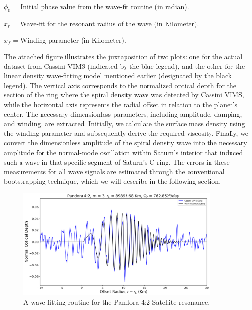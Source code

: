 \documentclass{article}
\begin{document}
\vspace{3pt}
\textbf{$\phi_{0}$} = Initial phase value from the wave-fit routine (in radian).

\vspace{3pt}
\textbf{$x_{r}$} = Wave-fit for the resonant radius of the wave (in Kilometer).

\vspace{3pt}
\textbf{$x_{f}$} = Winding parameter (in Kilometer).

\vspace{10pt}
The attached figure illustrates the juxtaposition of two plots: one for the actual dataset from Cassini VIMS (indicated by the blue legend), and the other for the linear density wave-fitting model mentioned earlier (designated by the black legend). The vertical axis corresponds to the normalized optical depth for the section of the ring where the spiral density wave was detected by Cassini VIMS, while the horizontal axis represents the radial offset in relation to the planet's center.
The necessary dimensionless parameters, including amplitude, damping, and winding, are extracted. Initially, we calculate the surface mass density using the winding parameter and subsequently derive the required viscosity. Finally, we convert the dimensionless amplitude of the spiral density wave into the necessary amplitude for the normal-mode oscillation within Saturn's interior that induced such a wave in that specific segment of Saturn's C-ring.
The errors in these measurements for all wave signals are estimated through the conventional bootstrapping technique, which we will describe in the following section.


\begin{figure}[h]
\centering 
\includegraphics[width=0.9\textwidth]{pandora42.png} 
\caption{A wave-fitting routine for the Pandora 4:2 Satellite resonance.} \label{fig:my_label}
\end{figure}
\end{document}
